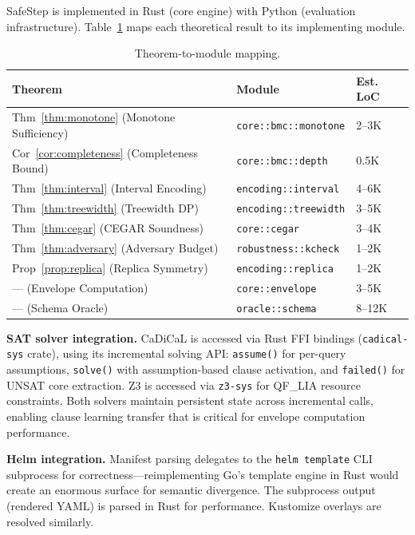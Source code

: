 \documentclass[10pt,twocolumn]{article}
\begin{document}
SafeStep is implemented in Rust (core engine) with Python (evaluation infrastructure). Table~\ref{tab:modules} maps each theoretical result to its implementing module.

\begin{table}[t]
\centering
\caption{Theorem-to-module mapping.}
\label{tab:modules}
\begin{tabular}{@{}lll@{}}
\toprule
\textbf{Theorem} & \textbf{Module} & \textbf{Est. LoC} \\
\midrule
Thm~\ref{thm:monotone} (Monotone Sufficiency) & \texttt{core::bmc::monotone} & 2--3K \\
Cor~\ref{cor:completeness} (Completeness Bound) & \texttt{core::bmc::depth} & 0.5K \\
Thm~\ref{thm:interval} (Interval Encoding) & \texttt{encoding::interval} & 4--6K \\
Thm~\ref{thm:treewidth} (Treewidth DP) & \texttt{encoding::treewidth} & 3--5K \\
Thm~\ref{thm:cegar} (CEGAR Soundness) & \texttt{core::cegar} & 3--4K \\
Thm~\ref{thm:adversary} (Adversary Budget) & \texttt{robustness::kcheck} & 1--2K \\
Prop~\ref{prop:replica} (Replica Symmetry) & \texttt{encoding::replica} & 1--2K \\
--- (Envelope Computation) & \texttt{core::envelope} & 3--5K \\
--- (Schema Oracle) & \texttt{oracle::schema} & 8--12K \\
\bottomrule
\end{tabular}
\end{table}

\textbf{SAT solver integration.} CaDiCaL is accessed via Rust FFI bindings (\texttt{cadical-sys} crate), using its incremental solving API: \texttt{assume()} for per-query assumptions, \texttt{solve()} with assumption-based clause activation, and \texttt{failed()} for UNSAT core extraction. Z3 is accessed via \texttt{z3-sys} for QF\_LIA resource constraints. Both solvers maintain persistent state across incremental calls, enabling clause learning transfer that is critical for envelope computation performance.

\textbf{Helm integration.} Manifest parsing delegates to the \texttt{helm template} CLI subprocess for correctness---reimplementing Go's template engine in Rust would create an enormous surface for semantic divergence. The subprocess output (rendered YAML) is parsed in Rust for performance. Kustomize overlays are resolved similarly.
\end{document}
